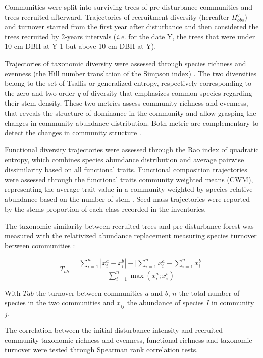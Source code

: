\documentclass[fleqn,10pt]{ArtEcoFoG} %
\begin{document}
\color{red} Communities were split into surviving trees of
pre-disturbance communities and trees recruited afterward. Trajectories
of recruitment diversity (hereafter \(H^q_{obs}\)) and turnover started
from the first year after disturbance and then considered the trees
recruited by 2-years intervals (\emph{i.e.} for the date Y, the trees
that were under 10 cm DBH at Y-1 but above 10 cm DBH at Y).
\color{black}

Trajectories of taxonomic diversity were assessed through species
richness and evenness (the Hill number translation of the Simpson index)
\citep{Chao2015, Marcon2015}. The two diversities belong to the set of
Tsallis or generalized entropy, respectively corresponding to the zero
and two order \emph{q} of diversity that emphasizes common species
\color{red} regarding their stem density. These two metrics assess
community richness and evenness, that reveals the structure of dominance
in the community and allow grasping the changes in community abundance
distribution. Both metric are complementary to detect the changes in
community structure \citep{Magurran2004}. \color{black}

Functional diversity trajectories were assessed through the Rao index of
quadratic entropy, which combines species abundance distribution and
average pairwise dissimilarity based on all functional traits.
Functional composition trajectories were assessed through the functional
traits community weighted means (CWM), representing the average trait
value in a community weighted by species relative abundance based on the
number of stem \citep{Diaz2007}. Seed mass trajectories were reported by
the stems proportion of each class recorded in the inventories.

\color{red} The taxonomic similarity between recruited trees and
pre-disturbance forest was measured with the relativized abundance
replacement measuring species turnover between communities
\citep{Podani2013a}:

\begin{equation}
T_{ab}=\frac{\sum_{i=1}^{n}|x_i^a - x_i^b| - \bigg| \sum_{i=1}^{n}{x_i^a} - \sum_{i=1}^{n}{x_i^b} \bigg|}{\sum_{i=1}^{n}\max{\left( x_i^a;x_i^b \right)}}
\label{eq:formNestedness}
\end{equation}

With \(Tab\) the turnover between communities \(a\) and \(b\), \(n\) the
total number of species in the two communities and \(x_{ij}\) the
abundance of species \(I\) in community \(j\).

The correlation between the initial disturbance intensity and recruited
community taxonomic richness and evenness, functional richness and
taxonomic turnover were tested through Spearman rank correlation tests.
\color{black}
\end{document}
